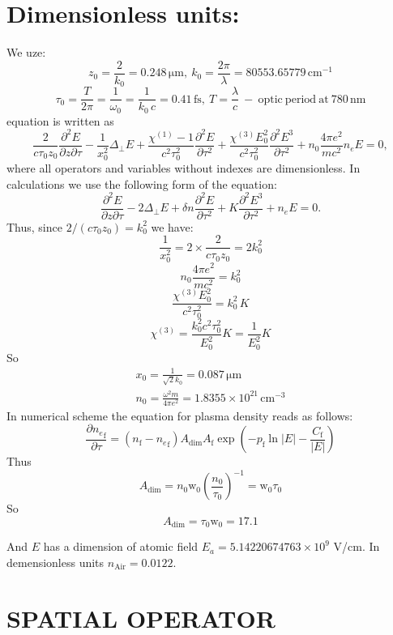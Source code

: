 \documentclass{article}
\newcommand{\dd}{\partial}
\newcommand{\ff}{\frac}
\newcommand{\chiO}{\chi^{(1)}}
\newcommand{\chiT}{\chi^{(3)}}
\begin{document}
\section{Dimensionless units:}
We uze:
\[ z_0=\ff{2}{k_0}=0.248\,\mathrm{\mu m}, \ k_0=\ff{2\pi}{\lambda}=80553.65779\,\mathrm{cm}^{-1} \]
\[ \tau_0=\ff{T}{2\pi} = \ff{1}{\omega_0} = \ff{1}{k_0 \, c} = 0.41\,\mathrm{fs}, \ T=\ff{\lambda}{c} \mathrm{\ - \ optic \ period \ at \ 780 \, nm} \]
equation is written as
\begin{equation}
\ff{2}{c \tau_0 z_0}\ff{\dd^2 E}{\dd z \dd \tau} - \ff{1}{x_0^2}\Delta_\perp E + \ff{\chiO-1}{c^2 \tau_0^2} \ff{\dd^2 E}{\dd \tau^2} + \ff{\chiT E_0^2}{c^2 \tau_0^2} \ff{\dd^2 E^3}{\dd \tau^2} + n_0 \ff{4\pi e^2}{m c^2} n_e E = 0,
\end{equation}
where all operators and variables without indexes are dimensionless.
In calculations we use the following form of the equation:
\[ \ff{\dd^2 E}{\dd z \dd \tau} - 2 \Delta_\perp E + \delta n \ff{\dd^2 E}{\dd \tau^2} + K \ff{\dd^2 E^3}{\dd \tau^2} + n_e E = 0. \]
Thus, since $2/(c \tau_0 z_0) = k_0^2$ we have:
\[  \ff{1}{x_0^2}=2 \times \ff{2}{c \tau_0 z_0} = 2 k_0^2 \]
\[ n_0 \ff{4\pi e^2}{m c^2}=k_0^2 \]
\[ \ff{\chiT E_0^2}{c^2 \tau_0^2} = k_0^2 \, K  \]
\[ \chiT = \ff{k_0^2 c^2 \tau_0^2}{E_0^2} K = \ff{1}{E_0^2} K  \]
So
\begin{eqnarray}
x_0=\ff{1}{\sqrt{2}k_0}=0.087\,\mathrm{\mu m} \\
n_0=\ff{\omega^2 m}{4 \pi e^2}=1.8355\times10^{21}\,\mathrm{cm^{-3}}
\end{eqnarray}
In numerical scheme the equation for plasma density reads as follows:
\[ \ff{\dd {n_e}_\mathrm{f}}{\dd \tau} = (n_\mathrm{f}-{n_e}_\mathrm{f}) A_\mathrm{dim} A_\mathrm{f} \exp\left( - p_\mathrm{f} \ln|E| - \ff{C_\mathrm{f}}{|E|} \right) \]
Thus
\[ A_\mathrm{dim} = n_0 \mathrm{w}_0 \left(\ff{n_0}{\tau_0}\right)^{-1} = \mathrm{w}_0 \tau_0 \]
So
\[ A_\mathrm{dim} = \tau_0 \mathrm{w}_0 = 17.1 \]

\noindent
And $E$ has a dimension of atomic field $E_a=5.14220674763\times10^9$ V/cm.
In demensionless units $n_\mathrm{Air}=0.0122$.






\section{SPATIAL OPERATOR}
\end{document}
